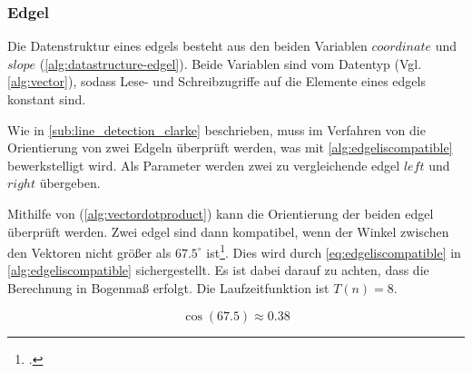 \subsubsection{Edgel} %
\label{sub:datenstruktur-edgels}

Die Datenstruktur eines \glspl{edgel} besteht aus den beiden Variablen $\mathit{coordinate}$ und $\mathit{slope}$
 (\autoref{alg:datastructure-edgel}). Beide Variablen sind vom Datentyp  (Vgl.
 \autoref{alg:vector}), sodass Lese- und Schreibzugriffe auf die Elemente eines \glspl{edgel} konstant sind.


Wie in \autoref{sub:line_detection_clarke} beschrieben, muss im Verfahren von \citeauthor{hirzer08} die Orientierung
 von zwei Edgeln überprüft werden, was mit \autoref{alg:edgeliscompatible} bewerkstelligt wird. Als Parameter
 werden zwei zu vergleichende \gls{edgel} $\mathit{left}$ und $\mathit{right}$ übergeben.

Mithilfe von  (\autoref{alg:vectordotproduct}) kann die Orientierung der beiden \gls{edgel}
 überprüft werden. Zwei \gls{edgel} sind dann kompatibel, wenn der Winkel zwischen den Vektoren nicht größer als
 $67.5^\circ$ ist\footcite[Vgl.][S.~417]{clarke96}. Dies wird durch \autoref{eq:edgeliscompatible} in
 \autoref{alg:edgeliscompatible} sichergestellt. Es ist dabei darauf zu achten, dass die Berechnung in Bogenmaß
 erfolgt. Die Laufzeitfunktion ist $T(n) = 8$.

\begin{equation}
	\label{eq:edgeliscompatible}
	\cos \left(67.5\right) \approx 0.38
\end{equation}

